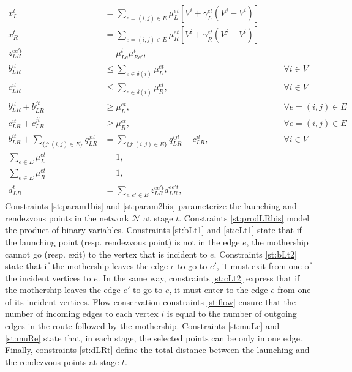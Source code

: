 \begin{align}
    x_L^t & = \sum_{e=(i, j)\in E} \mu_{L}^{et}\left[V^i + \gamma_{L}^{et}(V^j - V^i)\right]\label{st:param1bis}\\
    x_R^t & = \sum_{e=(i, j)\in E} \mu_{R}^{et}\left[ V^i + \gamma_{R}^{et}(V^j - V^i)\right]\label{st:param2bis}\\
    z_{LR}^{ee't} & = \mu_{Le}^t\mu_{Re'}^t,\label{st:prodLRbis}\\
    b_{LR}^{it} & \leq \sum_{e\in\delta(i)}\mu_{L}^{et}, \label{st:bLt1}&\qquad\forall i\in V \\
    c_{LR}^{it} & \leq \sum_{e\in\delta(i)}\mu_{R}^{et}, \label{st:cLt1}&\qquad\forall i\in V\\
    b_{LR}^{it} + b_{LR}^{jt} & \geq \mu_L^{et}, &\qquad \forall e=(i, j)\in E\label{st:bLt2}\\
    c_{LR}^{it} + c_{LR}^{jt} & \geq \mu_R^{et}, &\qquad \forall e=(i, j)\in E\label{st:cLt2}\\
    b_{LR}^{it} + \sum_{\{j:(i, j)\in E\}} q_{LR}^{jit} & = \sum_{\{j:(i, j)\in E\}} q_{LR}^{ijt} +  c_{LR}^{it}, \label{st:flow}&\qquad \forall i \in V\\
    \sum_{e\in E} \mu_{L}^{et} & = 1,  \label{st:muLe} \\
    \sum_{e\in E} \mu_{R}^{et} & = 1, \label{st:muRe}\\
    d_{LR}^t & = \sum_{e, e'\in E} z_{LR}^{ee't} d_{LR}^{ee't}, \label{st:dLRt}
\end{align}
\noindent
Constraints \eqref{st:param1bis} and \eqref{st:param2bis} parameterize the launching and rendezvous points in the network $\mathcal N$ at stage $t$. Constraints \eqref{st:prodLRbis} model the product of binary variables. Constraints \eqref{st:bLt1} and \eqref{st:cLt1} state that if the launching point (resp. rendezvous point) is not in the edge $e$, the mothership cannot go (resp. exit) to the vertex that is incident to $e$. Constraints \eqref{st:bLt2} state that if the mothership leaves the edge $e$ to go to $e'$, it must exit from one of the incident vertices to $e$. In the same way, constraints \eqref{st:cLt2} express that if the mothership leaves the edge $e'$ to go to $e$, it must enter to the edge $e$ from one of its incident vertices. Flow conservation constraints \eqref{st:flow} ensure that the number of incoming edges to each vertex $i$ is equal to the number of outgoing edges in the route followed by the mothership. Constraints \eqref{st:muLe} and \eqref{st:muRe} state that, in each stage, the selected points can be only in one edge. Finally, constraints \eqref{st:dLRt} define the total distance between the launching and the rendezvous points at  stage $t$.

